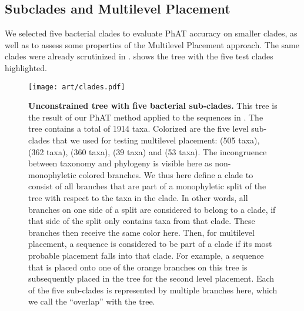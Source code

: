 
\subsection{Subclades and Multilevel Placement}
\label{ch:AutomaticTrees:sec:Evaluation:sub:MultilevelPlacement}

We selected five bacterial clades to evaluate \ac{PhAT} accuracy on smaller clades,
as well as to assess some properties of the Multilevel Placement approach.
The same clades were already scrutinized in  \citep{Kozlov2016}.
 shows the  tree with the five test clades highlighted.


\begin{figure}[hpbt]
    \centering
    \texttt{[image: art/clades.pdf]}
    \vspace*{0.5em}
    \caption[Unconstrained  tree with five bacterial sub-clades]{
        \textbf{Unconstrained  tree with five bacterial sub-clades.}
        This tree is the result of our \ac{PhAT} method
        applied to the  sequences in .
        The tree contains a total of 1914 taxa.
        Colorized are the five  level sub-clades that we used for testing multilevel placement:
         (505 taxa),  (362 taxa),  (360 taxa),
         (39 taxa) and  (53 taxa).
        The incongruence between taxonomy and phylogeny is visible here as non-monophyletic colored branches.
        We thus here define a clade to consist of all branches
        that are part of a monophyletic split of the tree with respect to the taxa in the clade.
        In other words, all branches on one side of a split are considered to belong to a clade,
        if that side of the split only contains taxa from that clade.
        These branches then receive the same color here.
        Then, for multilevel placement, a sequence is considered to be part of a clade
        if its most probable placement falls into that clade.
        For example, a sequence that is placed onto one of the orange branches on this tree
        is subsequently placed in the  tree for the second level placement.
        Each of the five sub-clades is represented by multiple branches here,
        which we call the ``overlap'' with the  tree.
    }
    \label{fig:clades}
\end{figure}

